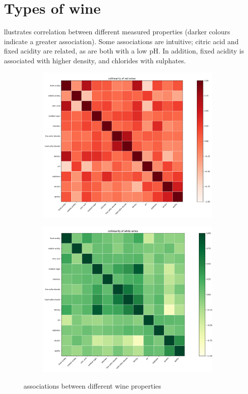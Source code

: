 \documentclass{article}
\begin{document}
\section*{Types of wine}
llustrates correlation between different measured properties (darker colours indicate a greater association).  Some associations are intuitive; 
citric acid and fixed acidity are related, as are both with a low pH.  In addition, fixed acidity is associated with higher density, and 
chlorides with sulphates.

\begin{figure}[H]
\centering
\begin{subfigure}
  \centering
  \includegraphics[width=0.4\linewidth]{figures/red_corr.png}
\end{subfigure}%
\begin{subfigure}
  \centering
  \includegraphics[width=0.4\linewidth]{figures/white_corr.png}
\end{subfigure}
\caption{associations between different wine properties}
\label{fig:correlations}
\end{figure}
\end{document}
